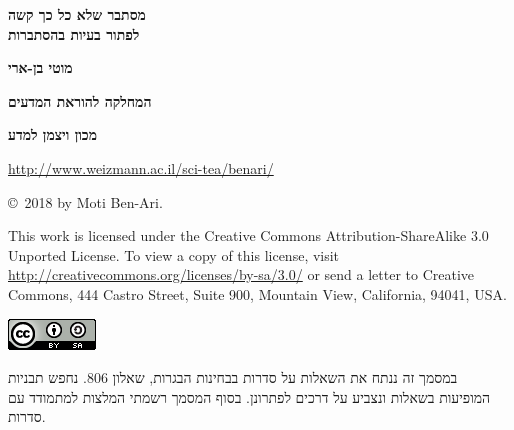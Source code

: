 \documentclass[12pt,a4paper]{article}
\begin{document}
\thispagestyle{empty}


\begin{center}
\textbf{\Huge מסתבר שלא כל כך קשה\\לפתור בעיות בהסתברות}

\bigskip
\bigskip

\textbf{\Large מוטי בן-ארי}

\bigskip

\textbf{\Large המחלקה להוראת המדעים}

\bigskip

\textbf{\Large מכון ויצמן למדע}

\bigskip

\url{http://www.weizmann.ac.il/sci-tea/benari/}

\bigskip

\end{center}


\begin{center}
\sffamily\copyright{}\  2018 by Moti Ben-Ari.
\end{center}

\begin{footnotesize}
\sffamily
This work is licensed under the Creative Commons Attribution-ShareAlike 3.0 Unported License. To view a copy of this license, visit \url{http://creativecommons.org/licenses/by-sa/3.0/} or send a letter to Creative Commons, 444 Castro Street, Suite 900, Mountain View, California, 94041, USA.
\end{footnotesize}

\bigskip

\begin{center}
\includegraphics[width=.2\textwidth]{../by-sa.png}
\end{center}

\bigskip
\bigskip
\bigskip

%
\newpage


במסמך זה ננתח את השאלות על סדרות בבחינות הבגרות, שאלון
$806$.
נחפש תבניות המופיעות בשאלות ונצביע על דרכים לפתרונן. בסוף המסמך רשמתי המלצות למתמודד עם סדרות.


\end{document}
